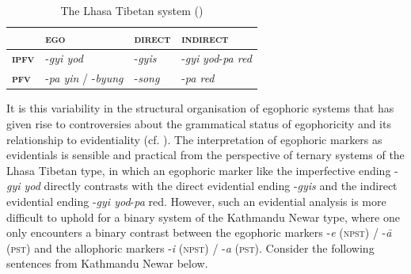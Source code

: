 \documentclass[output=paper]{langsci/langscibook}
\begin{document}
\begin{table}
\begin{tabularx}{.90\textwidth}{XXXX}
\hline
	&	\textbf{\textsc{ego}}	&	\textbf{\textsc{direct}}	&	\textbf{\textsc{indirect}}	\\
\hline
\textbf{\textsc{ipfv}}	&	-\textit{gyi yod}	&	-\textit{gyis}	&	-\textit{gyi} \textit{yod}-\textit{pa red}	\\
\textbf{\textsc{pfv}}	&	-\textit{pa yin} / -\textit{byung}	&	-\textit{song}	&	-\textit{pa red}	\\
\hline
\end{tabularx}
\caption{The Lhasa Tibetan system (\citealt{DeLancey1990})}
\label{tab:mw5}
\end{table}

It is this variability in the structural organisation of egophoric systems that has given rise to controversies about the grammatical status of egophoricity and its relationship to evidentiality (cf. \citealt[295–296]{Widmer2017b}). The interpretation of egophoric markers as evidentials is sensible and practical from the perspective of ternary systems of the Lhasa Tibetan type, in which an egophoric marker like the imperfective ending -\textit{gyi yod} directly contrasts with the direct evidential ending -\textit{gyis} and the indirect evidential ending -\textit{gyi yod}-\textit{pa} red. However, such an evidential analysis is more difficult to uphold for a binary system of the Kathmandu Newar type, where one only encounters a binary contrast between the egophoric markers -\textit{e} (\textsc{npst}) / -\textit{ā} (\textsc{pst}) and the allophoric markers -\textit{i} (\textsc{npst}) / -\textit{a} (\textsc{pst}). Consider the following sentences from Kathmandu Newar below.
\end{document}
